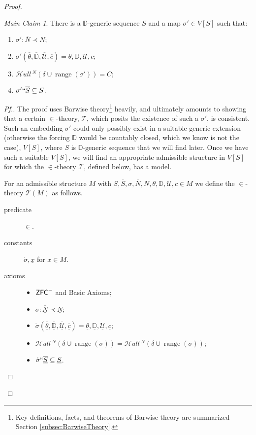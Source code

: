 \documentclass{amsart}
\theoremstyle{definition}
\theoremstyle{remark}
\newtheorem*{claim}{Main Claim}
\newcommand{\D}{\mathbb{D}}
\newcommand{\N}{{\overline{N}}}
\renewcommand{\S}{{\overline{S}}}
\newcommand{\U}{\mathcal{U}}
\newcommand{\ZFC}{\textup{\ensuremath{\textsf{ZFC}}}}
\DeclareMathOperator{\ran}{range}
\newcommand{\SH}{\mathcal{H}\textit{ull} \,}
\newcommand{\sk}[3]{\SH^{#1}( {#2} \cup {\ran(#3)} ) }
\begin{document}
\begin{proof}
\begin{claim} There is a $\D$-generic sequence $S$ and a map $\sigma' \in V[S]$ such that: \begin{enumerate}
	\item $\sigma': \N \prec N$;
	\item $\sigma'(\overline \theta, \overline{\D}, \overline{\U}, \overline c)=\theta, \D, \U, c$;
	\item \label{item:MainClaimC=Sk} $\sk{N}{\delta}{\sigma'} = C$;
	\item $\sigma' `` \S \subseteq S$.
\end{enumerate} \end{claim}
\begin{proof}[Pf.]  The proof uses Barwise theory\footnote{Key definitions, facts, and theorems of Barwise theory are summarized Section \ref{subsec:BarwiseTheory}.} heavily, and ultimately amounts to showing that a certain 
$\in$-theory, $\mathcal T$, which posits the existence of such a $\sigma'$, is consistent. Such an embedding $\sigma'$ could only possibly exist in a suitable generic extension (otherwise the forcing $\D$ would be countably closed, which we know is not the case), $V[S]$, where $S$ is $\D$-generic sequence that we will find later.
Once we have such a suitable $V[S]$, we will find an appropriate admissible structure in $V[S]$ for which the $\in$-theory $\mathcal T$, defined below, has a model.

\begin{samepage}
For an admissible structure $M$ with $S, \overline S, \sigma, \N, N, \theta, \D, \U, c \in M$ we define the $\in$-theory $\mathcal T(M)$ as follows.
\begin{description}
	\item[predicate] $\in$.
	\item[constants] $\dot{\sigma}, \underline x$ for $x \in M$.
	\item[axioms] \begin{itemize} \item $\ZFC^-$ and \textsf{Basic Axioms};
		\item $\dot \sigma : \overline{\underline N} \prec \underline N$;
		\item $\dot{\sigma}(\overline{\underline{\theta}}, \overline{\underline{\D}}, \overline{\underline{\U}}, \overline{\underline c})=\underline{\theta}, \underline{\D}, \underline{\U}, \underline{c}$;
		\item $\sk{\underline N}{\underline{\delta}}{\dot \sigma} = \sk{\underline N}{\underline \delta}{\underline \sigma}$;
		\item $\dot \sigma ``\overline{\underline S} \subseteq \underline S$.
	\end{itemize}
\end{description}
\end{samepage}


\end{proof}
\end{proof}
\end{document}
